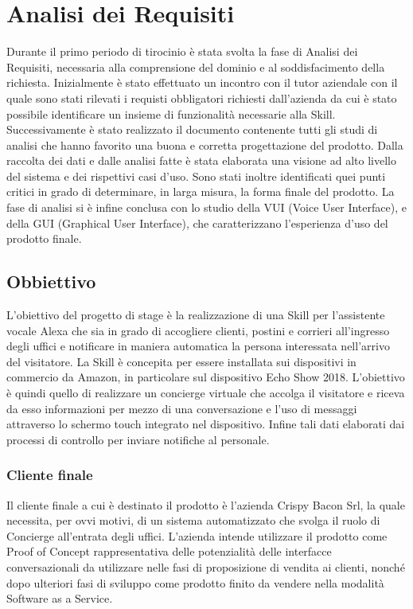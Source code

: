 
\chapter{Analisi dei Requisiti}
\label{cap:analisi_requisiti}
Durante il primo periodo di tirocinio è stata svolta la fase di Analisi dei Requisiti, necessaria alla comprensione del dominio e al soddisfacimento della richiesta. Inizialmente è stato effettuato un incontro con il tutor aziendale con il quale sono stati rilevati i requisti obbligatori richiesti dall'azienda da cui è stato possibile identificare un insieme di funzionalità necessarie alla Skill. Successivamente è stato realizzato il documento contenente tutti gli studi di analisi che hanno favorito una buona e corretta progettazione del prodotto. Dalla raccolta dei dati e dalle analisi fatte è stata elaborata una visione ad alto livello del sistema e dei rispettivi casi d’uso. Sono stati inoltre identificati quei punti critici in grado di determinare, in larga misura, la forma finale del prodotto.
La fase di analisi si è infine conclusa con lo studio della VUI (Voice User Interface), e della GUI (Graphical User Interface), che caratterizzano l'esperienza d'uso del prodotto finale. 

\section{Obbiettivo}
L’obiettivo del progetto di stage è la realizzazione di una Skill per l’assistente vocale Alexa che sia in grado di accogliere clienti, postini e corrieri all'ingresso degli uffici e notificare in maniera automatica la persona interessata nell'arrivo del visitatore. La Skill è concepita per essere installata sui dispositivi in commercio da Amazon, in particolare sul dispositivo Echo Show 2018. L’obiettivo è quindi quello di realizzare un concierge virtuale che accolga il visitatore e riceva da esso informazioni per mezzo di una conversazione e l’uso di messaggi attraverso lo schermo touch integrato nel dispositivo. Infine tali dati elaborati dai processi di controllo per inviare notifiche al personale.

\subsection{Cliente finale}
Il cliente finale a cui è destinato il prodotto è l’azienda Crispy Bacon Srl, la quale necessita, per ovvi motivi, di un sistema automatizzato che svolga il ruolo di Concierge all'entrata degli uffici. L'azienda intende utilizzare il prodotto come Proof of Concept rappresentativa delle potenzialità delle interfacce conversazionali da utilizzare nelle fasi di proposizione di vendita ai clienti, nonché dopo ulteriori fasi di sviluppo come prodotto finito da vendere nella modalità Software as a Service.

